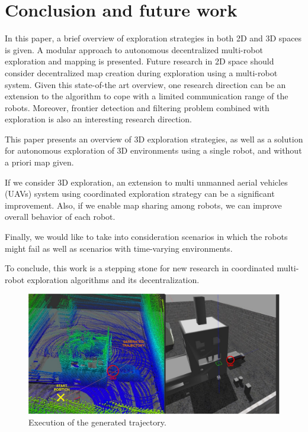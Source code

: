 \section{Conclusion and future work} \label{sec:conclusion}

In this paper, a brief overview of exploration strategies in both 2D and 3D spaces is given. A modular approach to autonomous decentralized multi-robot exploration and mapping is presented. 
Future research in 2D space should consider decentralized map creation during exploration using a multi-robot system. Given this state-of-the art overview, one research direction can be an extension to the algorithm to cope with a limited communication range of the robots. Moreover, frontier detection and filtering problem combined with exploration is also an interesting research direction.

This paper presents an overview of 3D exploration strategies, as well as a solution for autonomous exploration of 3D environments using a single robot, and without a priori map given.

If we consider 3D exploration, an extension to multi unmanned aerial vehicles (UAVs) system using coordinated exploration strategy can be a significant improvement. Also, if we enable map sharing among robots, we can improve overall behavior of each robot. 

Finally, we would like to take into consideration scenarios in which the robots might fail as well as scenarios with time-varying environments.

To conclude, this work is a stepping stone for new research in coordinated multi-robot exploration algorithms and its decentralization.

\begin{figure}[t!]
	\centering
	\includegraphics[width=1.0\columnwidth]{./pictures/rviz_gazebo.pdf}	
	\caption{Execution of the generated trajectory.}
	\label{fig:rviz_gazebo}
\end{figure}